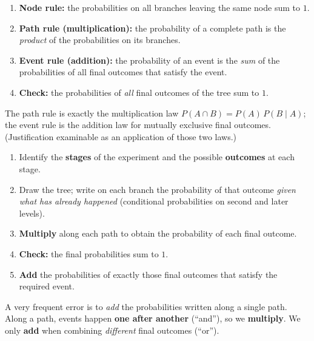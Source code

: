 \documentclass[11pt]{article}
\begin{document}
\begin{propriete}
\begin{enumerate}
\item \textbf{Node rule:} the probabilities on all branches leaving the same node sum to $1$.
\item \textbf{Path rule (multiplication):} the probability of a complete path is the \emph{product} of the probabilities on its branches.
\item \textbf{Event rule (addition):} the probability of an event is the \emph{sum} of the probabilities of all final outcomes that satisfy the event.
\item \textbf{Check:} the probabilities of \emph{all} final outcomes of the tree sum to $1$.
\end{enumerate}
The path rule is exactly the multiplication law $P(A\cap B)=P(A)\,P(B\mid A)$; the event rule is the addition law for mutually exclusive final outcomes. (Justification examinable as an application of those two laws.)
\end{propriete}

\begin{methode}
\begin{enumerate}
\item Identify the \textbf{stages} of the experiment and the possible \textbf{outcomes} at each stage.
\item Draw the tree; write on each branch the probability of that outcome \emph{given what has already happened} (conditional probabilities on second and later levels).
\item \textbf{Multiply} along each path to obtain the probability of each final outcome.
\item \textbf{Check:} the final probabilities sum to $1$.
\item \textbf{Add} the probabilities of exactly those final outcomes that satisfy the required event.
\end{enumerate}
\end{methode}

\begin{attention}
A very frequent error is to \emph{add} the probabilities written along a single path. Along a path, events happen \textbf{one after another} (``and''), so we \textbf{multiply}. We only \textbf{add} when combining \emph{different} final outcomes (``or'').
\end{attention}
\end{document}
